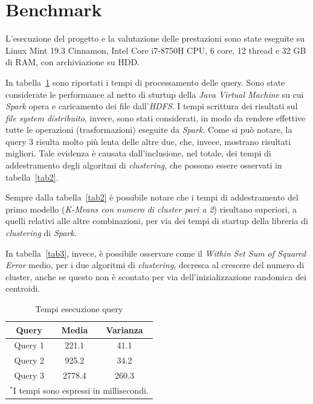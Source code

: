 \documentclass[conference]{IEEEtran}
\begin{document}
\section{\textbf{Benchmark}}
L'esecuzione del progetto e la valutazione delle prestazioni sono state eseguite su Linux Mint 19.3 Cinnamon, Intel Core i7-8750H CPU, 6 core, 12 thread e 32 GB di RAM, con archiviazione su HDD. \\
\par In tabella~\ref{tab1} sono riportati i tempi di processamento delle query. Sono state considerate le performance al netto di sturtup della \emph{Java Virtual Machine} su cui \emph{Spark} opera e caricamento dei file dall'\emph{HDFS}. I tempi scrittura dei risultati sul \emph{file system distribuito}, invece, sono stati considerati, in modo da rendere effettive tutte le operazioni (trasformazioni) eseguite da \emph{Spark}. Come si pu\`{o} notare, la query 3 risulta molto pi\`{u} lenta delle altre due, che, invece, mostrano risultati migliori. Tale evidenza \`{e} causata dall'inclusione, nel totale, dei tempi di addestramento degli algoritmi di \emph{clustering}, che possono essere osservati in tabella~\ref{tab2}.
\par Sempre dalla tabella~\ref{tab2} \`{e} possibile notare che i tempi di addestramento del primo modello (\emph{K-Means con numero di cluster pari a 2}) risultano superiori, a quelli relativi alle altre combinazioni, per via dei tempi di startup della libreria di \emph{clustering} di \emph{Spark}.
\par In tabella~\ref{tab3}, invece, \`{e} possibile osservare come il \emph{Within Set Sum of Squared Error} medio, per i due algoritmi di \emph{clustering}, decresca al crescere del numero di cluster, anche se questo non \`{e} scontato per via dell'inizializzazione randomica dei centroidi. 

\begin{table}[htbp]
\caption{Tempi esecuzione query}
\begin{center}
    \begin{tabular}{|c|c|c|}
    \hline
    \textbf{Query} & \textbf{Media} & \textbf{Varianza}  \\ \hline
    Query 1 & 221.1 & 41.1  \\ \hline
    Query 2 & 925.2 & 34.2 \\ \hline
    Query 3 & 2778.4 & 260.3 \\ \hline
    \multicolumn{3}{l}{$^{\mathrm{*}}$I tempi sono espressi in millisecondi.}
    \end{tabular}
\label{tab1}
\end{center}
\end{table}
\end{document}
